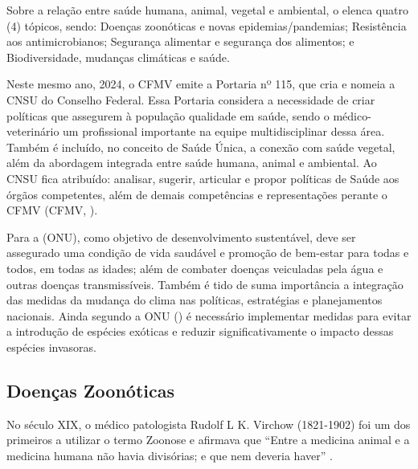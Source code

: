\indent Sobre a relação entre saúde humana, animal, vegetal e ambiental, o  elenca quatro (4) tópicos, sendo: Doenças zoonóticas e novas epidemias/pandemias; Resistência aos antimicrobianos; Segurança alimentar e segurança dos alimentos; e Biodiversidade, mudanças climáticas e saúde.




\indent Neste mesmo ano, 2024, o \acrshort{CFMV} emite a Portaria nº 115, que cria e nomeia a \acrfull{CNSU} do Conselho Federal. Essa Portaria considera  a necessidade de criar políticas que assegurem à população qualidade em saúde, sendo o médico-veterinário um  profissional importante na equipe multidisciplinar dessa área. Também é incluído, no conceito de Saúde Única, a conexão com saúde vegetal, além da abordagem integrada entre saúde humana, animal e ambiental. Ao \acrshort{CNSU} fica atribuído: analisar, sugerir, articular e propor políticas de Saúde aos órgãos competentes, além de demais competências e representações perante o \acrshort{CFMV} (\acrlong{CFMV}, \citeyear{CFMV2024PORTARIA}).

\indent Para a  (\acrshort{ONU}), como objetivo de desenvolvimento sustentável, deve ser assegurado uma condição de vida saudável e promoção de bem-estar para todas e todos, em todas as idades; além de combater doenças veiculadas pela água e outras doenças transmissíveis. Também é tido de suma importância a integração das medidas da mudança do clima nas políticas, estratégias e planejamentos nacionais. Ainda segundo a \acrshort{ONU} (\citeyear{ONUODS22}) é necessário implementar medidas para evitar a introdução de espécies exóticas e reduzir significativamente o impacto dessas espécies invasoras.

\subsection{Doenças Zoonóticas}

\indent No século XIX, o médico patologista Rudolf L K. Virchow (1821-1902) foi um dos primeiros a utilizar o termo Zoonose e afirmava que “Entre a medicina animal e a medicina humana não havia divisórias; e que nem deveria haver” \cite{CFMVSaude}.

